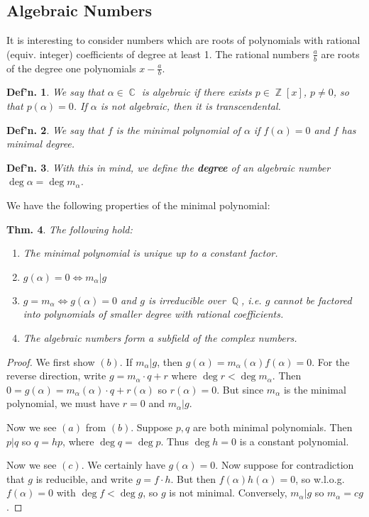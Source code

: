 \documentclass[12pt, a4paper]{book}
\DeclareMathOperator{\Q}{\mathbb{Q}}
\DeclareMathOperator{\Z}{\mathbb{Z}}
\DeclareMathOperator{\C}{\mathbb{C}}
\newtheorem{theorem}{Thm.}[section]
\newtheorem{definition}[theorem]{Def'n.}
\theoremstyle{nonumberplain}
\newtheorem{proof}{Proof}
\begin{document}
\subsection{Algebraic Numbers}
It is interesting to consider numbers which are roots of polynomials with rational (equiv. integer) coefficients of degree at least 1.
The rational numbers $\frac{a}{b}$ are roots of the degree one polynomials $x-\frac{a}{b}$.
\begin{definition}
    We say that $\alpha\in\C$ is algebraic if there exists $p\in \Z[x]$, $p\neq 0$, so that $p(\alpha)=0$.
    If $\alpha$ is not algebraic, then it is transcendental.
\end{definition}
\begin{definition}
    We say that $f$ is the minimal polynomial of $\alpha$ if $f(\alpha)=0$ and $f$ has minimal degree.
\end{definition}
\begin{definition}
    With this in mind, we define the \textbf{degree} of an algebraic number $\deg\alpha=\deg m_\alpha$.
\end{definition}    
We have the following properties of the minimal polynomial:
\begin{theorem}
    The following hold:
\begin{enumerate}[label=(\alph*)]
        \item The minimal polynomial is unique up to a constant factor.
        \item $g(\alpha)=0\Leftrightarrow m_\alpha|g$
        \item $g=m_\alpha\Leftrightarrow g(\alpha)=0$ and $g$ is irreducible over $\Q$, i.e. $g$ cannot be factored into polynomials of smaller degree with rational coefficients.
        \item The algebraic numbers form a subfield of the complex numbers.
    \end{enumerate}
\end{theorem}
\begin{proof}
    We first show $(b)$.
    If $m_\alpha|g$, then $g(\alpha)=m_\alpha(\alpha)f(\alpha)=0$.
    For the reverse direction, write $g=m_\alpha\cdot q+r$ where $\deg r<\deg m_\alpha$.
    Then $0=g(\alpha)=m_\alpha(\alpha)\cdot q+r(\alpha)$ so $r(\alpha)=0$.
    But since $m_\alpha$ is the minimal polynomial, we must have $r=0$ and $m_\alpha|g$.

    Now we see $(a)$ from $(b)$.
    Suppose $p,q$ are both minimal polynomials.
    Then $p|q$ so $q=hp$, where $\deg q=\deg p$.
    Thus $\deg h=0$ is a constant polynomial.

    Now we see $(c)$.
    We certainly have $g(\alpha)=0$.
    Now suppose for contradiction that $g$ is reducible, and write $g=f\cdot h$.
    But then $f(\alpha)h(\alpha)=0$, so w.l.o.g. $f(\alpha)=0$ with $\deg f<\deg g$, so $g$ is not minimal.
    Conversely, $m_\alpha|g$ so $m_\alpha=cg$.
\end{proof}
\end{document}
